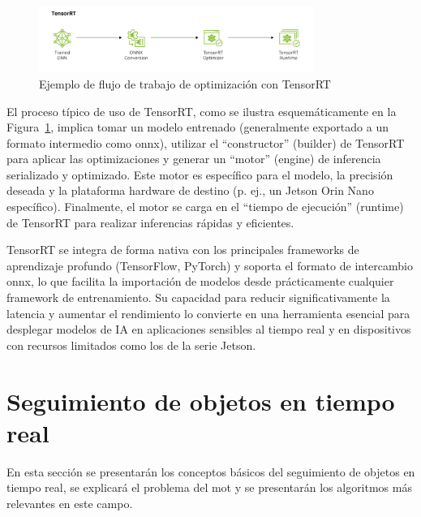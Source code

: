 \documentclass[11pt,spanish,listoffigures,listoftables]{tfgetsinf}
\begin{document}
\begin{figure}[H]
   \centering
   \includegraphics[width=0.8\textwidth]{images/estado_del_arte/TensorRT_pipeline.png}
   \caption[Ejemplo de flujo de trabajo de optimización con TensorRT]{Ejemplo de flujo de trabajo de optimización con TensorRT}
   \label{fig:tensorrt_architecture}
\end{figure}

El proceso típico de uso de TensorRT, como se ilustra esquemáticamente en la Figura~\ref{fig:tensorrt_architecture}, implica tomar un modelo entrenado (generalmente exportado a un formato intermedio como \gls{onnx}), utilizar el ``constructor'' (builder) de TensorRT para aplicar las optimizaciones y generar un ``motor'' (engine) de inferencia serializado y optimizado. Este motor es específico para el modelo, la precisión deseada y la plataforma hardware de destino (p. ej., un Jetson Orin Nano específico). Finalmente, el motor se carga en el ``tiempo de ejecución'' (runtime) de TensorRT para realizar inferencias rápidas y eficientes.

TensorRT se integra de forma nativa con los principales frameworks de aprendizaje profundo (TensorFlow, PyTorch) y soporta el formato de intercambio \gls{onnx}, lo que facilita la importación de modelos desde prácticamente cualquier framework de entrenamiento. Su capacidad para reducir significativamente la latencia y aumentar el rendimiento lo convierte en una herramienta esencial para desplegar modelos de IA en aplicaciones sensibles al tiempo real y en dispositivos con recursos limitados como los de la serie Jetson.



\section{Seguimiento de objetos en tiempo real} \label{sec:mot}
En esta sección se presentarán los conceptos básicos del seguimiento de objetos en tiempo real, se explicará el problema del \gls{mot} y se presentarán los algoritmos más relevantes en este campo.
\end{document}
